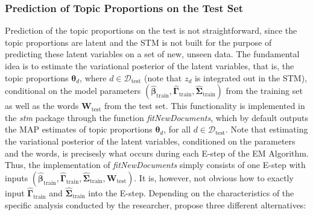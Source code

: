 \subsubsection{Prediction of Topic Proportions on the Test Set}
\label{Prediction of Topic Proportions on the Test Set}

Prediction of the topic proportions on the test is not straightforward, since the topic proportions are latent and the STM is not built for the purpose of predicting these latent variables on a set of new, unseen data. The fundamental idea is to estimate the variational posterior of the latent variables, that is, the topic proportions $\boldsymbol{\theta}_d$, where $d \in \mathcal{D}_{\text{test}}$ (note that $z_d$ is integrated out in the STM), conditional on the model parameters $(\hat{\boldsymbol{\beta}}_{\text{train}}, \hat{\boldsymbol{\Gamma}}_{\text{train}}, \hat{\boldsymbol{\Sigma}}_{\text{train}})$ from the training set as well as the words $\boldsymbol{W}_{\text{test}}$ from the test set. This functionality is implemented in the \textit{stm} package through the function \textit{fitNewDocuments}, which by default outputs the MAP estimates of topic proportions $\boldsymbol{\theta}_d$, for all $d \in \mathcal{D}_{\text{test}}$. Note that estimating the variational posterior of the latent variables, conditioned on the parameters and the words, is precisesly what occurs during each E-step of the EM Algorithm. Thus, the implementation of \textit{fitNewDocuments} simply consists of one E-step with inputs $(\hat{\boldsymbol{\beta}}_{\text{train}}, \hat{\boldsymbol{\Gamma}}_{\text{train}}, \hat{\boldsymbol{\Sigma}}_{\text{train}}, \boldsymbol{W}_{\text{test}})$. It is, however, not obvious how to exactly input $\hat{\boldsymbol{\Gamma}}_{\text{train}}$ and  $\hat{\boldsymbol{\Sigma}}_{\text{train}}$ into the E-step. Depending on the characteristics of the specific analysis conducted by the researcher, \cite{egami2018make} propose three different alternatives:
